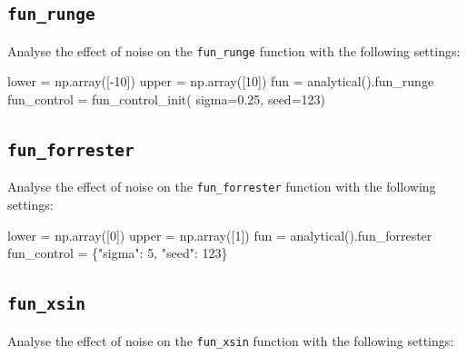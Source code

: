 \documentclass[
  letterpaper,
  DIV=11,
  numbers=noendperiod]{scrreprt}
\newenvironment{Shaded}{\begin{snugshade}}{\end{snugshade}}
\newcommand{\DecValTok}[1]{\textcolor[rgb]{0.68,0.00,0.00}{#1}}
\newcommand{\FloatTok}[1]{\textcolor[rgb]{0.68,0.00,0.00}{#1}}
\newcommand{\NormalTok}[1]{\textcolor[rgb]{0.00,0.23,0.31}{#1}}
\newcommand{\OperatorTok}[1]{\textcolor[rgb]{0.37,0.37,0.37}{#1}}
\newcommand{\StringTok}[1]{\textcolor[rgb]{0.13,0.47,0.30}{#1}}
\begin{document}
\subsection{\texorpdfstring{\texttt{fun\_runge}}{fun\_runge}}\label{fun_runge-2}

Analyse the effect of noise on the \texttt{fun\_runge} function with the
following settings:

\begin{Shaded}
\begin{Highlighting}[]
\NormalTok{lower }\OperatorTok{=}\NormalTok{ np.array([}\OperatorTok{{-}}\DecValTok{10}\NormalTok{])}
\NormalTok{upper }\OperatorTok{=}\NormalTok{ np.array([}\DecValTok{10}\NormalTok{])}
\NormalTok{fun }\OperatorTok{=}\NormalTok{ analytical().fun\_runge}
\NormalTok{fun\_control }\OperatorTok{=}\NormalTok{ fun\_control\_init(    }
\NormalTok{    sigma}\OperatorTok{=}\FloatTok{0.25}\NormalTok{,}
\NormalTok{    seed}\OperatorTok{=}\DecValTok{123}\NormalTok{)}
\end{Highlighting}
\end{Shaded}

\subsection{\texorpdfstring{\texttt{fun\_forrester}}{fun\_forrester}}\label{fun_forrester-1}

Analyse the effect of noise on the \texttt{fun\_forrester} function with
the following settings:

\begin{Shaded}
\begin{Highlighting}[]
\NormalTok{lower }\OperatorTok{=}\NormalTok{ np.array([}\DecValTok{0}\NormalTok{])}
\NormalTok{upper }\OperatorTok{=}\NormalTok{ np.array([}\DecValTok{1}\NormalTok{])}
\NormalTok{fun }\OperatorTok{=}\NormalTok{ analytical().fun\_forrester}
\NormalTok{fun\_control }\OperatorTok{=}\NormalTok{ \{}\StringTok{"sigma"}\NormalTok{: }\DecValTok{5}\NormalTok{,}
               \StringTok{"seed"}\NormalTok{: }\DecValTok{123}\NormalTok{\}}
\end{Highlighting}
\end{Shaded}

\subsection{\texorpdfstring{\texttt{fun\_xsin}}{fun\_xsin}}\label{fun_xsin-1}

Analyse the effect of noise on the \texttt{fun\_xsin} function with the
following settings:
\end{document}
